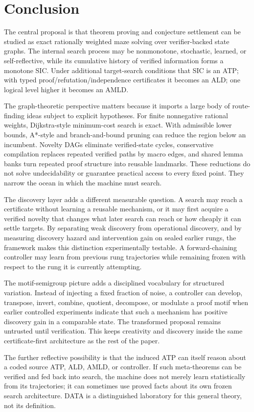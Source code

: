 \section{Conclusion}
The central proposal is that theorem proving and conjecture settlement can be studied as exact rationally weighted maze solving over verifier-backed state graphs. The internal search process may be nonmonotone, stochastic, learned, or self-reflective, while its cumulative history of verified information forms a monotone SIC. Under additional target-search conditions that SIC is an ATP; with typed proof/refutation/independence certificates it becomes an ALD; one logical level higher it becomes an AMLD.

The graph-theoretic perspective matters because it imports a large body of route-finding ideas subject to explicit hypotheses. For finite nonnegative rational weights, Dijkstra-style minimum-cost search is exact. With admissible lower bounds, A*-style and branch-and-bound pruning can reduce the region below an incumbent. Novelty DAGs eliminate verified-state cycles, conservative compilation replaces repeated verified paths by macro edges, and shared lemma banks turn repeated proof structure into reusable landmarks. These reductions do not solve undecidability or guarantee practical access to every fixed point. They narrow the ocean in which the machine must search.

The discovery layer adds a different measurable question. A search may reach a certificate without learning a reusable mechanism, or it may first acquire a verified novelty that changes what later search can reach or how cheaply it can settle targets. By separating weak discovery from operational discovery, and by measuring discovery hazard and intervention gain on sealed earlier rungs, the framework makes this distinction experimentally testable. A forward-chaining controller may learn from previous rung trajectories while remaining frozen with respect to the rung it is currently attempting.

The motif-semigroup picture adds a disciplined vocabulary for structured variation. Instead of injecting a fixed fraction of noise, a controller can develop, transpose, invert, combine, quotient, decompose, or modulate a proof motif when earlier controlled experiments indicate that such a mechanism has positive discovery gain in a comparable state. The transformed proposal remains untrusted until verification. This keeps creativity and discovery inside the same certificate-first architecture as the rest of the paper.

The further reflective possibility is that the induced ATP can itself reason about a coded source ATP, ALD, AMLD, or controller. If such meta-theorems can be verified and fed back into search, the machine does not merely learn statistically from its trajectories; it can sometimes use proved facts about its own frozen search architecture. DATA is a distinguished laboratory for this general theory, not its definition.

